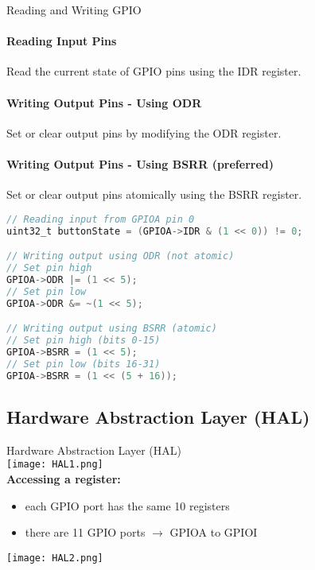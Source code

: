 \begin{KR}{Reading and Writing GPIO}
\paragraph{Reading Input Pins}
Read the current state of GPIO pins using the IDR register.
\paragraph{Writing Output Pins - Using ODR}
Set or clear output pins by modifying the ODR register.
\paragraph{Writing Output Pins - Using BSRR (preferred)}
Set or clear output pins atomically using the BSRR register.

\begin{lstlisting}[language=C, style=basesmol] 
// Reading input from GPIOA pin 0
uint32_t buttonState = (GPIOA->IDR & (1 << 0)) != 0;

// Writing output using ODR (not atomic)
// Set pin high
GPIOA->ODR |= (1 << 5);
// Set pin low
GPIOA->ODR &= ~(1 << 5);

// Writing output using BSRR (atomic)
// Set pin high (bits 0-15)
GPIOA->BSRR = (1 << 5);
// Set pin low (bits 16-31)
GPIOA->BSRR = (1 << (5 + 16));
\end{lstlisting}
\end{KR}



\subsection{Hardware Abstraction Layer (HAL)}

\begin{definition}{Hardware Abstraction Layer (HAL)}\\
    \texttt{[image: HAL1.png]}\\
    \textbf{Accessing a register:}
    \begin{itemize}
        \item each GPIO port has the same 10 registers 
        \item there are 11 GPIO ports $\rightarrow$ GPIOA to GPIOI
    \end{itemize}
    \texttt{[image: HAL2.png]}
\end{definition}

